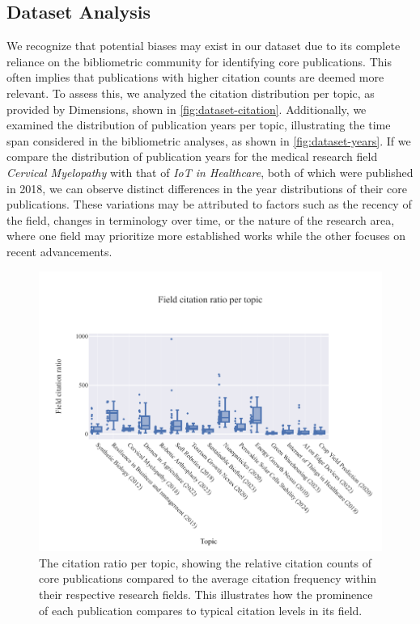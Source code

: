 \subsection{Dataset Analysis}
We recognize that potential biases may exist in our dataset due to its complete reliance on the bibliometric community for identifying core publications. This often implies that publications with higher citation counts are deemed more relevant. To assess this, we analyzed the citation distribution per topic, as provided by Dimensions, shown in \autoref{fig:dataset-citation}. Additionally, we examined the distribution of publication years per topic, illustrating the time span considered in the bibliometric analyses, as shown in \autoref{fig:dataset-years}.  If we compare the distribution of publication years for the medical research field \textit{Cervical Myelopathy} with that of \textit{IoT in Healthcare}, both of which were published in 2018, we can observe distinct differences in the year distributions of their core publications. These variations may be attributed to factors such as the recency of the field, changes in terminology over time, or the nature of the research area, where one field may prioritize more established works while the other focuses on recent advancements.

\begin{figure}
	\centering	
	\includegraphics{pics/citation-distribution.pdf}
	\caption[Field citation ratio per topic]{The citation ratio per topic, showing the relative citation counts of core publications compared to the average citation frequency within their respective research fields. This illustrates how the prominence of each publication compares to typical citation levels in its field.}
	\label{fig:dataset-citation}
\end{figure}

